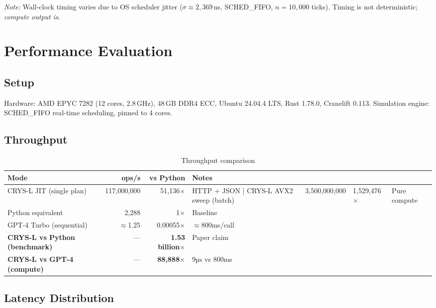 \documentclass[11pt]{article}
\begin{document}
\textit{Note:} Wall-clock timing varies due to OS scheduler jitter
($\sigma \approx 2{,}369$\,ns, SCHED\_FIFO, $n = 10{,}000$ ticks).
Timing is not deterministic; \emph{compute output is}.

\section{Performance Evaluation}

\subsection{Setup}

Hardware: AMD EPYC 7282 (12 cores, 2.8\,GHz), 48\,GB DDR4 ECC,
Ubuntu 24.04.4 LTS, Rust 1.78.0, Cranelift 0.113.
Simulation engine: SCHED\_FIFO real-time scheduling, pinned to 4 cores.

\subsection{Throughput}

\begin{table}[h]
\centering
\caption{Throughput comparison}
\label{tab:throughput}
\begin{tabular}{lrrl}
\toprule
\textbf{Mode} & \textbf{ops/s} & \textbf{vs Python} & \textbf{Notes} \\
\midrule
CRYS-L JIT (single plan)   & 117,000,000 & 51,136$\times$      & HTTP + JSON |
CRYS-L AVX2 sweep (batch)  & 3,500,000,000 & 1,529,476$\times$ & Pure compute \\
Python equivalent           & 2,288        & 1$\times$           & Baseline \\
GPT-4 Turbo (sequential)   & $\approx$1.25 & 0.00055$\times$   & $\approx$800ms/call \\
\midrule
\textbf{CRYS-L vs Python (benchmark)} & — & \textbf{1.53 billion$\times$} & Paper claim \\
\textbf{CRYS-L vs GPT-4 (compute)} & — & \textbf{88,888$\times$} & 9µs vs 800ms \\
\bottomrule
\end{tabular}
\end{table}

\subsection{Latency Distribution}
\end{document}
